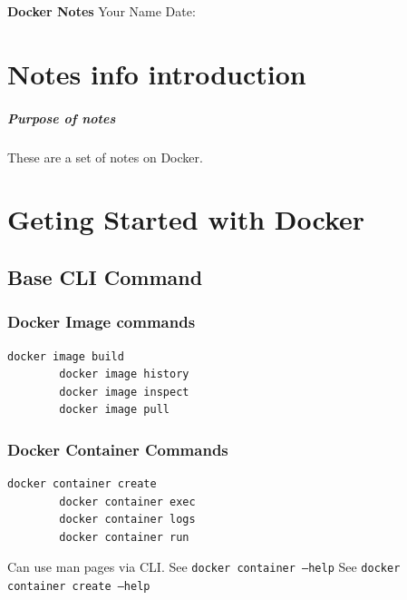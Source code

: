 \documentclass[11pt]{book}
\begin{document}
    \begin{titlepage}
        \centering
        \vspace*{2in}
        \Huge \textbf{Docker Notes}
        \vfill
        \Large Your Name
        \vfill
        \Large Date: %
    \end{titlepage}

    \newpage

    \tableofcontents
    \newpage


    \chapter{Notes info introduction}

    \paragraph{Purpose of notes}
    These are a set of notes on Docker.


    \chapter{Geting Started with Docker}


    \section{Base CLI Command}

    \subsection{Docker Image commands}
    \begin{lstlisting}[style=terminal]
        docker image build
        docker image history
        docker image inspect
        docker image pull
    \end{lstlisting}

    \subsection{Docker Container Commands}
    \begin{lstlisting}[style=terminal]
        docker container create
        docker container exec
        docker container logs
        docker container run
    \end{lstlisting}

    Can use man pages via CLI.
    See \texttt{docker container --help}
    See \texttt{docker container create --help}
\end{document}
